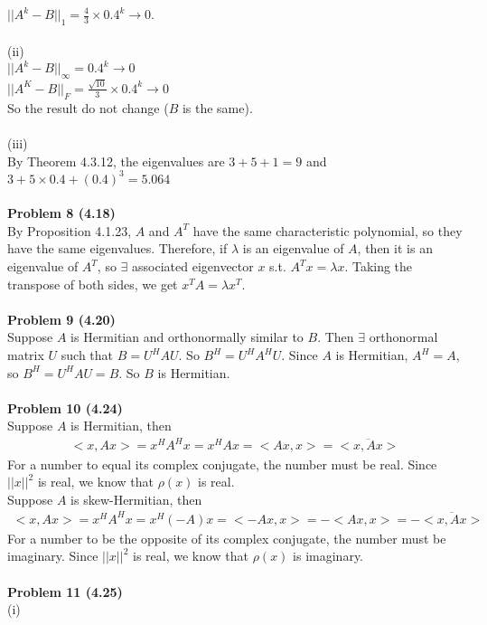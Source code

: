 \documentclass[letterpaper,12pt]{article}
\theoremstyle{definition}
\begin{document}
$||A^k - B||_1 = \frac{4}{3}\times 0.4^k\rightarrow 0$.\\
\\
(ii)\\
$||A^k-B||_{\infty} = 0.4^k \rightarrow 0$\\
$||A^K-B||_F = \frac{\sqrt{10}}{3}\times 0.4^k\rightarrow 0$\\
So the result do not change ($B$ is the same).\\
\\
(iii)\\
By Theorem 4.3.12, the eigenvalues are $3+5+1 = 9$ and $3+5\times 0.4+(0.4)^3 = 5.064$\\
\\
\noindent\textbf{Problem 8 (4.18)} \\
By Proposition 4.1.23, $A$ and $A^T$ have the same characteristic polynomial, so they have the same eigenvalues. Therefore, if $\lambda$ is an eigenvalue of $A$, then it is an eigenvalue of $A^T$, so $\exists$ associated eigenvector $x$ s.t. $A^T x = \lambda x$. Taking the transpose of both sides, we get $x^T A =\lambda x^T$.\\
\\
\noindent\textbf{Problem 9 (4.20)} \\
Suppose $A$ is Hermitian and orthonormally similar to $B$. Then $\exists $ orthonormal matrix $U$ such that $B = U^H A U$. So $B^H = U^H A^H U$. Since $A$ is Hermitian, $A^H = A$, so $B^H = U^H AU =B$. So $B$ is Hermitian.\\
\\
\noindent\textbf{Problem 10 (4.24)} \\
Suppose $A$ is Hermitian, then
\begin{align*}
<x, Ax> = x^HA^H x = x^HAx = <Ax, x> = \overline{<x, Ax>}
\end{align*}
For a number to equal its complex conjugate, the number must be real. Since $||x||^2$ is real, we know that $\rho(x)$ is real.\\
Suppose $A$ is skew-Hermitian, then
\begin{align*}
<x, Ax> = x^HA^H x = x^H(-A)x = <-Ax, x> = -<Ax, x> = -\overline{<x, Ax>}
\end{align*}
For a number to be the opposite of its complex conjugate, the number must be imaginary. Since $||x||^2$ is real, we know that $\rho(x)$ is imaginary.\\
\\
\noindent\textbf{Problem 11 (4.25)} \\
(i)\\
\end{document}
